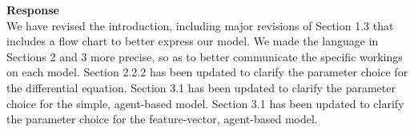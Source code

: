 \textbf{Response } \\
We have revised the introduction, including major revisions of Section 1.3 that includes a flow chart to better express our model.
We made the language in Sections 2 and 3 more precise, so as to better communicate the specific workings on each model.
Section 2.2.2 has been updated to clarify the parameter choice for the differential equation.
Section 3.1 has been updated to clarify the parameter choice for the simple, agent-based model.
Section 3.1 has been updated to clarify the parameter choice for the feature-vector, agent-based model.

